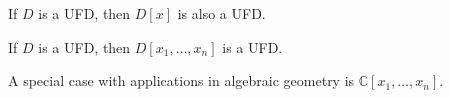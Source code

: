 \begin{theorem}
	If $D$ is a UFD, then $D[x]$ is also a UFD.
\end{theorem}

\begin{corollary}
	If $D$ is a UFD, then $D[x_1,\hdots,x_n]$ is a UFD.
\end{corollary}

A special case with applications in algebraic geometry is $\mathbb C[x_1,\hdots,x_n]$.